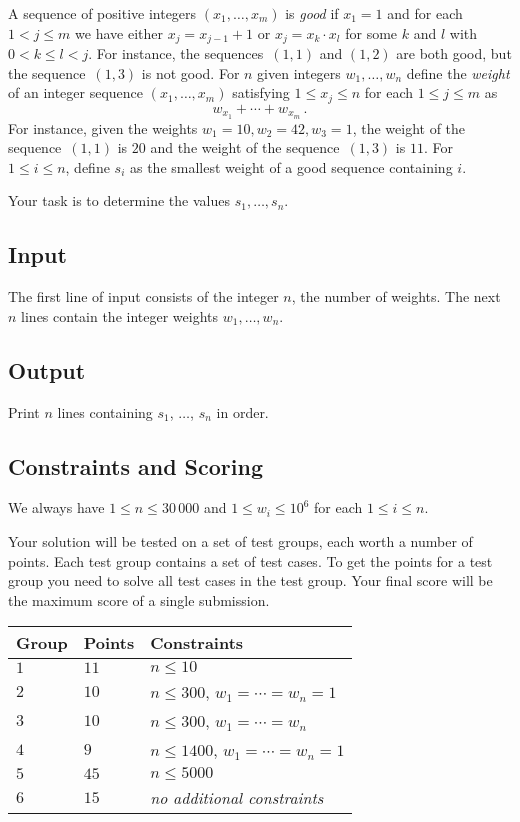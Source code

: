 
\noindent
A sequence of positive integers $(x_1,\ldots,x_m)$ is \emph{good} if  $x_1 = 1$ and for each $1 < j \leq m$ we have either $x_j=x_{j-1}+1$ or $x_j=x_k\cdot x_l$ for some $k$ and $l$ with $0< k\leq l< j$.
For instance, the sequences~$(1,1)$ and $(1,2)$ are both good, but the sequence~$(1,3)$ is not good.
For  $n$ given integers $w_1,\ldots,w_n$ define 
the \emph{weight} of an integer sequence $(x_1,\ldots,x_m)$ satisfying $1\leq x_j \leq n$ for each $1\leq j\leq m$ as
\[ w_{x_1} +\cdots +w_{x_m}\,.\] 
For instance, given the weights $w_1=10,  w_2=42,w_3= 1$, the weight of the sequence~$(1,1)$ is $20$ and the weight of the sequence~$(1,3)$ is $11$.
For $1\leq i\leq n$, define $s_i$ as the smallest weight of a good sequence containing $i$.

Your task is to determine the values $s_1,\ldots ,s_n$.

\subsection*{Input}

The first line of input consists of the integer $n$, the number of weights.
The next $n$ lines contain the integer weights $w_1, \ldots, w_n$.

\subsection*{Output}

Print $n$ lines containing $s_1$, $\ldots$, $s_n$ in order.

\subsection*{Constraints and Scoring}

We always have
$1\leq n \leq 30\,000$ %
and
$1\leq w_i \leq 10^6$ for each $1\leq i \leq n$.%

Your solution will be tested on a set of test groups, each worth a number of points.
Each test group contains a set of test cases.
To get the points for a test group you need to solve all test cases in the test group.
Your final score will be the maximum score of a single submission.

\medskip
\begin{tabular}{lll}
Group & Points & Constraints \\\hline
$1$   & $11$ & $n\leq 10$ \\
$2$   & $10$ & $n\leq 300$, $w_1=\cdots=w_n = 1$ \\
$3$   & $10$ & $n\leq 300$, $w_1=\cdots=w_n$ \\ %
$4$   & $9$ & $n\leq 1400$, $w_1=\cdots=w_n = 1$ \\
$5$   & $45$ & $n\leq 5000$\\
$6$   & $15$ & \emph{no additional constraints}
\end{tabular}
